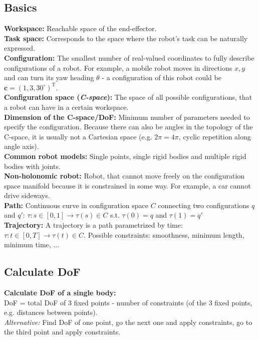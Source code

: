\begin{multicols*}{2}
\subsection{Basics}
\textbf{Workspace:} Reachable space of the end-effector. \\
\textbf{Task space:} Corresponds to the space where the robot's task can be naturally expressed. \\
\textbf{Configuration:} The smallest number of real-valued coordinates to fully describe configurations of a robot. For example, a mobile robot moves in directions $x,y$ and can turn its yaw heading $\theta$ - a configuration of this robot could be $\mathbold{c} = (1,3,30^\circ)^\mathrm{T}$. \\
\textbf{Configuration space (\textit{C-space}):} The space of all possible configurations, that a robot can have in a certain workspace. \\
\textbf{Dimension of the C-space/DoF:} Minimum number of parameters needed to specify the configuration. Because there can also be angles in the topology of the C-space, it is usually not a Cartesian space (e.g. $2\pi = 4\pi$, cyclic repetition along angle axis). \\
\textbf{Common robot models:} Single points, single rigid bodies and multiple rigid bodies with joints. \\
\textbf{Non-holonomic robot:} Robot, that cannot move freely on the
configuration space manifold because it is constrained in some way. For example, a car cannot drive sideways. \\
\textbf{Path:} Continuous curve in configuration space $C$ connecting two configurations $q$ and $q'$:
$\tau: s \in [0,1] \rightarrow \tau(s) \in C$ s.t. $\tau(0) = q$ and $\tau(1) = q'$\\
\textbf{Trajectory:} A trajectory is a path parametrized by time:
$\tau: t \in [0, T] \rightarrow \tau(t) \in C$.
Possible constraints: smoothness, minimum length, minimum time, ...

\subsection{Calculate DoF}
\textbf{Calculate DoF of a single body:}\\
DoF = total DoF of 3 fixed points - number of constraints (of the 3 fixed points, e.g. distances between points). \\
\textit{Alternative:} Find DoF of one point, go the next one and apply constraints, go to the third point and apply constraints. \par


\end{multicols*}

